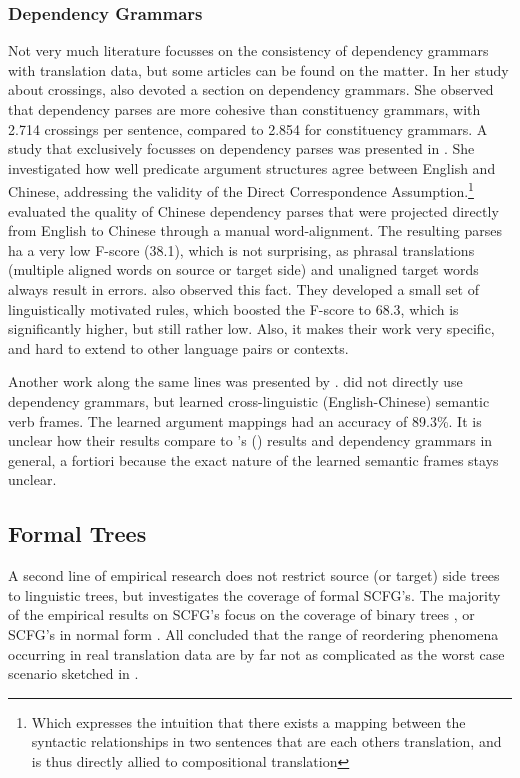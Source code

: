 \documentclass{report}
\theoremstyle{definition}
\theoremstyle{plain}
\def\citepos#1{\citeauthor{#1}'s (\citeyear{#1})}
\begin{document}
\subsubsection{Dependency Grammars}

Not very much literature focusses on the consistency of dependency grammars with translation data, but some articles can be found on the matter. In her study about crossings, \citeauthor{fox2002phrasal} also devoted a section on dependency grammars. She observed that dependency parses are more cohesive than constituency grammars, with
2.714 crossings per sentence, compared to 2.854 for constituency grammars. A study that exclusively focusses on dependency parses was presented in \cite{hwa2002evaluating}. She investigated how well predicate argument structures agree between English and Chinese, addressing the validity of the Direct Correspondence Assumption.\footnote{Which expresses the intuition that there exists a mapping between the syntactic relationships in two sentences that are each others translation, and is thus directly allied to compositional translation} \citeauthor{hwa2002evaluating} evaluated the quality of Chinese dependency parses that were projected directly from English to Chinese through a manual word-alignment. The resulting parses ha a very low F-score (38.1), which is not surprising, as phrasal translations (multiple aligned words on source or target side) and unaligned target words always result in errors. \citeauthor{hwa2002evaluating} also observed this fact. They developed a small set of linguistically motivated rules, which boosted the F-score to 68.3, which is significantly higher, but still rather low. Also, it makes their work very specific, and hard to extend to other language pairs or contexts.

Another work along the same lines was presented by \cite{fung2006automatic}. \citeauthor{fung2006automatic} did not directly use dependency grammars, but learned cross-linguistic (English-Chinese) semantic verb frames. The learned argument mappings  had an accuracy of 89.3\%. It is unclear how their results compare to \citepos{hwa2002evaluating} results and dependency grammars in general, a fortiori because the exact nature of the learned semantic frames stays unclear.

\subsection{Formal Trees}

A second line of empirical research does not restrict source (or target) side trees to linguistic trees, but investigates the coverage of formal SCFG's. The majority of the empirical results on SCFG's focus on the coverage of binary trees \citep[e.g.,]{zhang2006synchronous,huang2009binarization}, or SCFG's in normal form \citep[e.g.,][]{sogaard2009empirical1,sogaard2009empirical2,sogaard2010can}. All concluded that the range of reordering phenomena occurring in real translation data are by far not as complicated as the worst case scenario sketched in \cite{satta2005some}.
\end{document}
